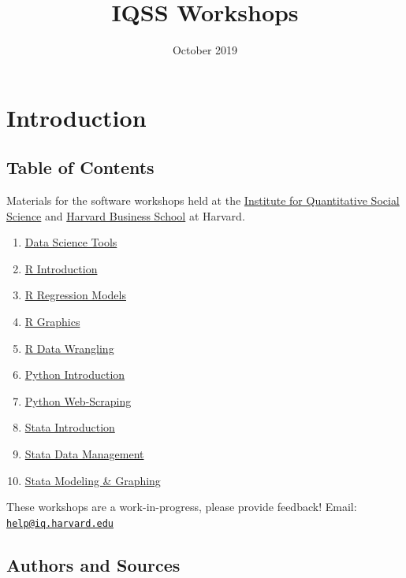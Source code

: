 \documentclass[]{book}
\title{IQSS Workshops}
\author{}
\date{October 2019}
\providecommand{\tightlist}{%
  \setlength{\itemsep}{0pt}\setlength{\parskip}{0pt}}
\begin{document}
\maketitle

{
\setcounter{tocdepth}{1}
\tableofcontents
}
\chapter*{Introduction}\label{introduction}

\section*{Table of Contents}\label{table-of-contents}

Materials for the software workshops held at the
\href{http://iq.harvard.edu}{Institute for Quantitative Social Science}
and \href{https://training.rcs.hbs.org}{Harvard Business School} at
Harvard.

\begin{enumerate}
\def\labelenumi{\arabic{enumi}.}
\tightlist
\item
  \href{./DataScienceTools.html}{Data Science Tools}
\item
  \href{./Rintro.html}{R Introduction}
\item
  \href{./Rmodels.html}{R Regression Models}
\item
  \href{./Rgraphics.html}{R Graphics}
\item
  \href{./RDataWrangling.html}{R Data Wrangling}
\item
  \href{./PythonIntro.html}{Python Introduction}
\item
  \href{./PythonWebScrape.html}{Python Web-Scraping}
\item
  \href{./StataIntro.html}{Stata Introduction}
\item
  \href{./StataDatMan.html}{Stata Data Management}
\item
  \href{./StataModGraph.html}{Stata Modeling \& Graphing}
\end{enumerate}

These workshops are a work-in-progress, please provide feedback! Email:
\href{mailto:help@iq.harvard.edu}{\nolinkurl{help@iq.harvard.edu}}

\section*{Authors and Sources}\label{authors-and-sources}
\end{document}
